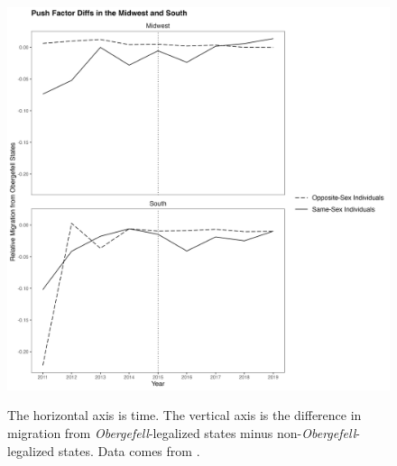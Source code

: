 \documentclass[12pt,letterpaper]{article}
\begin{document}
\begin{figure}[htbp]
    \centering
    \caption{}
    \label{fig: region_ante_diffs}
    \includegraphics[width=.75\linewidth]{outputs/summary_stats/region_ante_diffs.png}

    \vspace{0.5em}
    \begin{minipage}{0.75\linewidth}
        \footnotesize The horizontal axis is time. The vertical axis is the difference in migration from \textit{Obergefell}-legalized states minus non-\textit{Obergefell}-legalized states. Data comes from \citet{28}.
    \end{minipage}
\end{figure}
\end{document}
